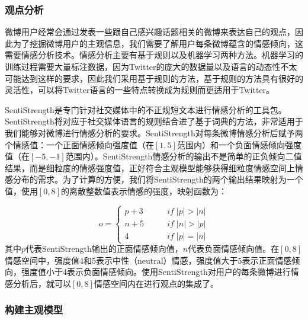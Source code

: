 \begin{landscape}
\subsubsection{观点分析}
\label{sentiment}
微博用户经常会通过发表一些跟自己感兴趣话题相关的微博来表达自己的观点，因此为了挖掘微博用户的主观信息，我们需要了解用户每条微博蕴含的情感倾向，这需要情感分析技术。情感分析主要有基于规则以及机器学习两种方法。机器学习的训练过程需要大量标注数据，因为Twitter的庞大的数据量以及语言的动态性不太可能达到这样的要求，因此我们采用基于规则的方法，基于规则的方法具有很好的灵活性，可以将Twitter语言的一些特点转换成为规则而更适用于Twitter。

SentiStrength是专门针对社交媒体中的不正规短文本进行情感分析的工具包。SentiStrength将对应于社交媒体语言的规则结合进了基于词典的方法，非常适用于我们能够对微博进行情感分析的要求。SentiStrength对每条微博情感分析后赋予两个情感值：一个正面情感倾向强度值（在$ [1,5] $范围内）和一个负面情感倾向强度值（在$ [-5,-1] $范围内）。SentiStrength情感分析的输出不是简单的正负倾向二值结果，而是细粒度的情感强度值，正好符合主观模型能够获得细粒度情感空间上情感分布的需求。为了计算的方便，我们将SentiStrength的两个输出结果映射为一个值，使用$ [0, 8] $的离散整数值表示情感的强度，映射函数为：

\begin{equation}
\label{opinionmap}
o=\begin{cases} 
{p+3} &  \qquad if \; \vert p \vert > \vert n \vert \\
{n+5} &  \qquad if \; \vert n \vert > \vert p \vert \\
{4}  &   \qquad if \; \vert p \vert = \vert n \vert
\end{cases}
\end{equation}
其中$ p $代表SentiStrength输出的正面情感倾向值，$ n $代表负面情感倾向值。在$ [0, 8] $情感空间中，强度值4和5表示中性（neutral）情感，强度值大于5表示正面情感倾向，强度值小于4表示负面情感倾向。使用SentiStrength对用户的每条微博进行情感分析后，就可以$ [0, 8] $情感空间内在进行观点的集成了。

\subsubsection{构建主观模型}
\label{concrete}


\end{landscape}
